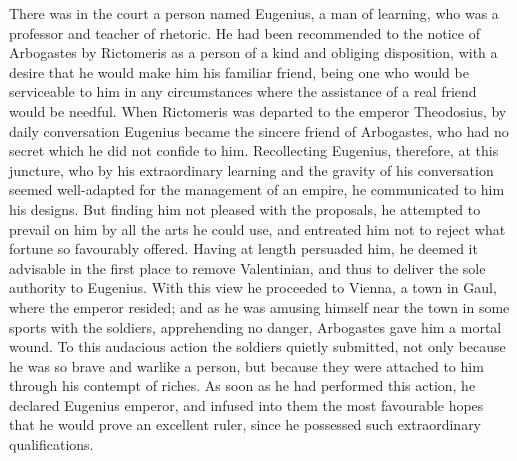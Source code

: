 There was in the court a person named Eugenius, a man of learning, who was a professor and teacher of rhetoric. He had been recommended to the notice of Arbogastes by Rictomeris as a person of a kind and obliging disposition, with a desire that he would make him his familiar friend, being one who would be serviceable to him in any circumstances where the assistance of a real friend would be needful. When Rictomeris was departed to the emperor Theodosius, by daily conversation Eugenius became the sincere friend of Arbogastes, who had no secret which he did not confide to him. Recollecting Eugenius, therefore, at this juncture, who by his extraordinary learning and the gravity of his conversation seemed well-adapted for the management of an empire, he communicated to him his designs. But finding him not pleased with the proposals, he attempted to prevail on him by all the arts he could use, and entreated him not to reject what fortune so favourably offered. Having at length persuaded him, he deemed it advisable in the first place to remove Valentinian, and thus to deliver the sole authority to Eugenius. With this view he proceeded to Vienna, a town in Gaul, where the emperor resided; and as he was amusing himself near the town in some sports with the soldiers, apprehending no danger, Arbogastes gave him a mortal wound. To this audacious action the soldiers quietly submitted, not only because he was so brave and warlike a person, but because they were attached to him through his contempt of riches. As soon as he had performed this action, he declared Eugenius emperor, and infused into them the most favourable hopes that he would prove an excellent ruler, since he possessed such extraordinary qualifications.

